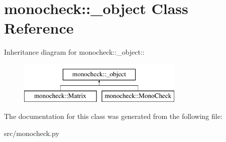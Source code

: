 \hypertarget{classmonocheck_1_1__object}{
\section{monocheck::\_\-object Class Reference}
\label{d8/dec/classmonocheck_1_1__object}
}
Inheritance diagram for monocheck::\_\-object::\begin{figure}[H]
\begin{center}
\leavevmode
\includegraphics[height=2cm]{d8/dec/classmonocheck_1_1__object}
\end{center}
\end{figure}


The documentation for this class was generated from the following file:\begin{DoxyCompactItemize}
\item 
src/monocheck.py\end{DoxyCompactItemize}
